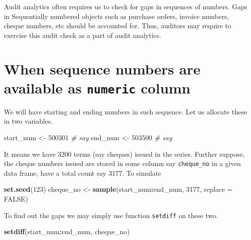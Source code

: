 \documentclass[
]{book}
\newenvironment{Shaded}{\begin{snugshade}}{\end{snugshade}}
\newcommand{\AttributeTok}[1]{\textcolor[rgb]{0.13,0.29,0.53}{#1}}
\newcommand{\CommentTok}[1]{\textcolor[rgb]{0.56,0.35,0.01}{\textit{#1}}}
\newcommand{\ConstantTok}[1]{\textcolor[rgb]{0.56,0.35,0.01}{#1}}
\newcommand{\DecValTok}[1]{\textcolor[rgb]{0.00,0.00,0.81}{#1}}
\newcommand{\FunctionTok}[1]{\textcolor[rgb]{0.13,0.29,0.53}{\textbf{#1}}}
\newcommand{\NormalTok}[1]{#1}
\newcommand{\OtherTok}[1]{\textcolor[rgb]{0.56,0.35,0.01}{#1}}
\newcommand{\SpecialCharTok}[1]{\textcolor[rgb]{0.81,0.36,0.00}{\textbf{#1}}}
\begin{document}
Audit analytics often requires us to check for gaps in sequences of numbers. Gaps in Sequentially numbered objects such as purchase orders, invoice numbers, cheque numbers, etc should be accounted for. Thus, auditors may require to exercise this audit check as a part of audit analytics.

\hypertarget{when-sequence-numbers-are-available-as-numeric-column}{%
\section{\texorpdfstring{When sequence numbers are available as \texttt{numeric} column}{When sequence numbers are available as numeric column}}\label{when-sequence-numbers-are-available-as-numeric-column}}

We will have starting and ending numbers in such sequence. Let us allocate these in two variables.

\begin{Shaded}
\begin{Highlighting}[]
\NormalTok{start\_num }\OtherTok{\textless{}{-}} \DecValTok{500301} \CommentTok{\# say}
\NormalTok{end\_num }\OtherTok{\textless{}{-}} \DecValTok{503500} \CommentTok{\# say}
\end{Highlighting}
\end{Shaded}

It means we have 3200 terms (say cheques) issued in the series. Further suppose, the cheque numbers issued are stored in some column say \texttt{cheque\_no} in a given data frame, have a total count say 3177. To simulate

\begin{Shaded}
\begin{Highlighting}[]
\FunctionTok{set.seed}\NormalTok{(}\DecValTok{123}\NormalTok{)}
\NormalTok{cheque\_no }\OtherTok{\textless{}{-}} \FunctionTok{sample}\NormalTok{(start\_num}\SpecialCharTok{:}\NormalTok{end\_num, }\DecValTok{3177}\NormalTok{, }\AttributeTok{replace =} \ConstantTok{FALSE}\NormalTok{)}
\end{Highlighting}
\end{Shaded}

To find out the gaps we may simply use function \texttt{setdiff} on these two.

\begin{Shaded}
\begin{Highlighting}[]
\FunctionTok{setdiff}\NormalTok{(start\_num}\SpecialCharTok{:}\NormalTok{end\_num, cheque\_no)}
\end{Highlighting}
\end{Shaded}
\end{document}
